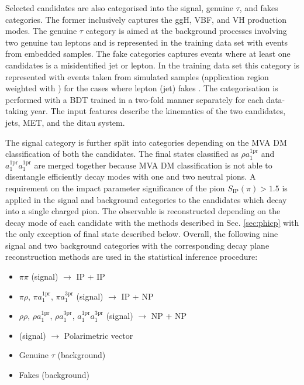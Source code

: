 Selected \tauh\tauh candidates are also categorised into the signal, genuine $\tau$, and fakes categories. The former inclusively captures the ggH, VBF, and VH production modes. The genuine $\tau$ category is aimed at the background processes involving two genuine tau leptons and is represented in the training data set with events from embedded samples. The fake categories captures events where at least one \tauh candidates is a misidentified jet or lepton. In the training data set this category is represented  with events taken from simulated samples (application region weighted with \ff) for the cases where lepton (jet) fakes \tauh. The categorisation is performed with a BDT trained in a two-fold manner separately for each data-taking year. The input features describe the kinematics of the two \tauh candidates, jets, MET, and the ditau system. 

The signal category is further split into categories depending on the MVA DM classification of both the \tauh candidates. The final states classified as $\rho a_1^\text{1pr}$ and $a_1^\text{1pr} a_1^\text{1pr}$ are merged together because MVA DM classification is not able to disentangle efficiently decay modes with one and two neutral pions. A requirement on the impact parameter significance of the pion $S_\text{IP}(\pi) > 1.5$ is applied in the signal and background categories to the \tauh candidates which decay into a single charged pion. The \phicp observable is reconstructed depending on the decay mode of each \tauh candidate with the methods described in Sec. \ref{sec:phicp} with the only exception of \aaa final state described below. Overall, the following nine signal and two background categories with the corresponding decay plane reconstruction methods are used in the statistical inference procedure:

\begin{itemize}
    \item $\pi\pi$ (signal) $\longrightarrow$ IP + IP
    \item $\pi\rho$, $\pi a_1^\text{1pr}$, $\pi a_1^\text{3pr}$ (signal) $\longrightarrow$ IP + NP
    \item $\rho \rho$, $\rho a_1^\text{1pr}$, $\rho a_1^\text{3pr}$, $a_1^\text{1pr} a_1^\text{3pr}$ (signal) $\longrightarrow$ NP + NP
    \item \aaa (signal) $\longrightarrow$ Polarimetric vector
    \item Genuine $\tau$ (background)
    \item Fakes (background)
\end{itemize}

